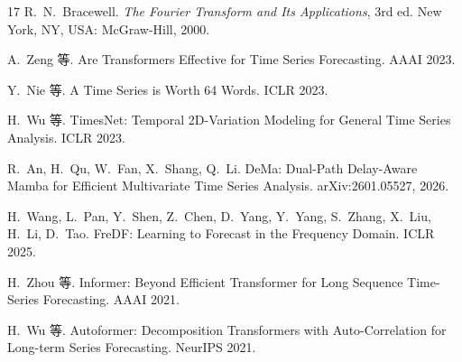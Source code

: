 \begin{thebibliography}{17}
 R.~N.~Bracewell. \emph{The Fourier Transform and Its Applications}, 3rd ed. New York, NY, USA: McGraw-Hill, 2000.

 A.~Zeng 等. Are Transformers Effective for Time Series Forecasting. AAAI 2023.

 Y.~Nie 等. A Time Series is Worth 64 Words. ICLR 2023.

 H.~Wu 等. TimesNet: Temporal 2D-Variation Modeling for General Time Series Analysis. ICLR 2023.

 R.~An, H.~Qu, W.~Fan, X.~Shang, Q.~Li. DeMa: Dual-Path Delay-Aware Mamba for Efficient Multivariate Time Series Analysis. arXiv:2601.05527, 2026.

 H.~Wang, L.~Pan, Y.~Shen, Z.~Chen, D.~Yang, Y.~Yang, S.~Zhang, X.~Liu, H.~Li, D.~Tao. FreDF: Learning to Forecast in the Frequency Domain. ICLR 2025.

 H.~Zhou 等. Informer: Beyond Efficient Transformer for Long Sequence Time-Series Forecasting. AAAI 2021.

 H.~Wu 等. Autoformer: Decomposition Transformers with Auto-Correlation for Long-term Series Forecasting. NeurIPS 2021.

\end{thebibliography}
